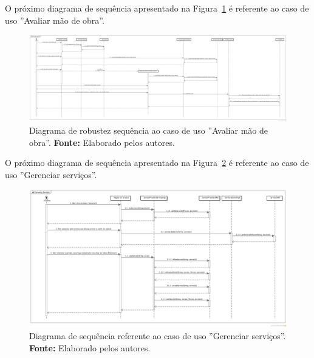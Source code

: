 \begin{landscape}
O próximo diagrama de sequência apresentado na Figura~\ref{fig:ap1:diagrama_sequencia_avaliar_mao_de_obra} é referente ao caso de uso ''Avaliar mão de obra''.

\newpage
\captionsetup[figure]{list=no}
\begin{figure}[h!]
	\centerline{\includegraphics[scale=0.2]{./imagens/apendices/diagrama-sequencia-avaliar-mao-de-obra.png}}
	\caption[Diagrama de sequência referente ao caso de uso ''Avaliar mão de obra''.]
	{Diagrama de robustez sequência ao caso de uso ''Avaliar mão de obra''. \textbf{Fonte:} Elaborado pelos autores.}
	\label{fig:ap1:diagrama_sequencia_avaliar_mao_de_obra}
\end{figure}

O próximo diagrama de sequência apresentado na Figura~\ref{fig:ap1:diagrama_sequencia_gerenciar_servicos} é referente ao caso de uso ''Gerenciar serviços''.

\newpage
\captionsetup[figure]{list=no}
\begin{figure}[h!]
	\centerline{\includegraphics[scale=0.4]{./imagens/apendices/diagrama-sequencia-gerenciar-servicos.png}}
	\caption[Diagrama de sequência referente ao caso de uso ''Gerenciar serviços''.]
	{Diagrama de sequência referente ao caso de uso ''Gerenciar serviços''. \textbf{Fonte:} Elaborado pelos autores.}
	\label{fig:ap1:diagrama_sequencia_gerenciar_servicos}
\end{figure}


\end{landscape}
